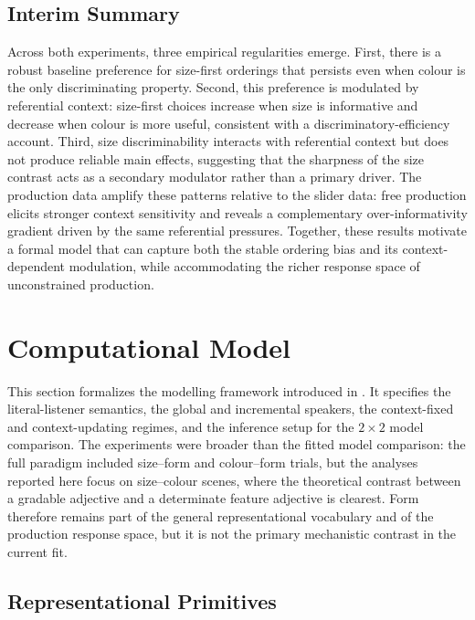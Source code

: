 \documentclass[man,floatsintext]{apa7}
\begin{document}
\subsection{Interim Summary}

Across both experiments, three empirical regularities emerge.
First, there is a robust baseline preference for size-first orderings that persists even when colour is the only discriminating property.
Second, this preference is modulated by referential context: size-first choices increase when size is informative and decrease when colour is more useful, consistent with a discriminatory-efficiency account.
Third, size discriminability interacts with referential context but does not produce reliable main effects, suggesting that the sharpness of the size contrast acts as a secondary modulator rather than a primary driver.
The production data amplify these patterns relative to the slider data: free production elicits stronger context sensitivity and reveals a complementary over-informativity gradient driven by the same referential pressures.
Together, these results motivate a formal model that can capture both the stable ordering bias and its context-dependent modulation, while accommodating the richer response space of unconstrained production.

\section{Computational Model}
\label{sec:model}

This section formalizes the modelling framework introduced in .
It specifies the literal-listener semantics, the global and incremental speakers, the context-fixed and context-updating regimes, and the inference setup for the $2 \times 2$ model comparison.
The experiments were broader than the fitted model comparison: the full paradigm included size--form and colour--form trials, but the analyses reported here focus on size--colour scenes, where the theoretical contrast between a gradable adjective and a determinate feature adjective is clearest.
Form therefore remains part of the general representational vocabulary and of the production response space, but it is not the primary mechanistic contrast in the current fit.

\subsection{Representational Primitives}
\label{sec:model:primitives}
\end{document}
